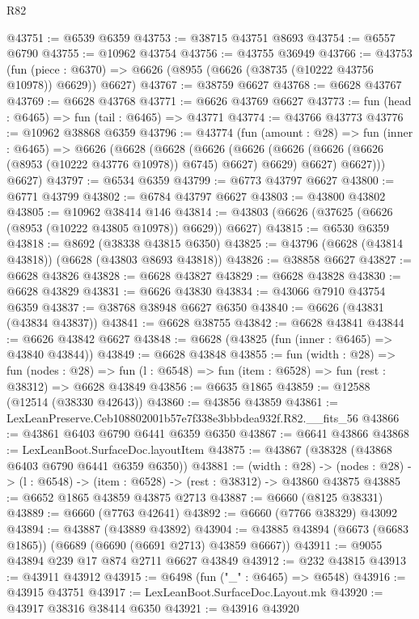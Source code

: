 \begin{lexlean}{R82}
\begin{coremodule}
@43751 := @6539 @6359
@43753 := @38715 @43751 @8693
@43754 := @6557 @6790
@43755 := @10962 @43754
@43756 := @43755 @36949
@43766 := @43753
    (fun (piece : @6370) => @6626 (@8955 (@6626 (@38735 (@10222 @43756 @10978)) @6629)) @6627)
@43767 := @38759 @6627
@43768 := @6628 @43767
@43769 := @6628 @43768
@43771 := @6626 @43769 @6627
@43773 := fun (head : @6465) => fun (tail : @6465) => @43771
@43774 := @43766 @43773
@43776 := @10962 @38868 @6359
@43796 := @43774
    (fun (amount : @28) =>
    fun (inner : @6465) =>
    @6626
      (@6628
        (@6628
          (@6626
            (@6626 (@6626 (@6626 (@6626 (@8953 (@10222 @43776 @10978)) @6745) @6627) @6629) @6627)
            @6627)))
      @6627)
@43797 := @6534 @6359
@43799 := @6773 @43797 @6627
@43800 := @6771 @43799
@43802 := @6784 @43797 @6627
@43803 := @43800 @43802
@43805 := @10962 @38414 @146
@43814 := @43803 (@6626 (@37625 (@6626 (@8953 (@10222 @43805 @10978)) @6629)) @6627)
@43815 := @6530 @6359
@43818 := @8692 (@38338 @43815 @6350)
@43825 := @43796 (@6628 (@43814 @43818)) (@6628 (@43803 @8693 @43818))
@43826 := @38858 @6627
@43827 := @6628 @43826
@43828 := @6628 @43827
@43829 := @6628 @43828
@43830 := @6628 @43829
@43831 := @6626 @43830
@43834 := @43066 @7910 @43754 @6359
@43837 := @38768 @38948 @6627 @6350
@43840 := @6626 (@43831 (@43834 @43837))
@43841 := @6628 @38755
@43842 := @6628 @43841
@43844 := @6626 @43842 @6627
@43848 := @6628 (@43825 (fun (inner : @6465) => @43840 @43844))
@43849 := @6628 @43848
@43855 := fun (width : @28) =>
  fun (nodes : @28) => fun (l : @6548) => fun (item : @6528) => fun (rest : @38312) => @6628 @43849
@43856 := @6635 @1865
@43859 := @12588 (@12514 (@38330 @42643))
@43860 := @43856 @43859
@43861 := LexLeanPreserve.Ceb108802001b57e7f338e3bbbdea932f.R82.__fits_56
@43866 := @43861 @6403 @6790 @6441 @6359 @6350
@43867 := @6641 @43866
@43868 := LexLeanBoot.SurfaceDoc.layoutItem
@43875 := @43867 (@38328 (@43868 @6403 @6790 @6441 @6359 @6350))
@43881 := (width : @28) ->
  (nodes : @28) -> (l : @6548) -> (item : @6528) -> (rest : @38312) -> @43860 @43875
@43885 := @6652 @1865 @43859 @43875 @2713
@43887 := @6660 (@8125 @38331)
@43889 := @6660 (@7763 @42641)
@43892 := @6660 (@7766 @38329) @43092
@43894 := @43887 (@43889 @43892)
@43904 := @43885 @43894 (@6673 (@6683 @1865)) (@6689 (@6690 (@6691 @2713) @43859 @6667))
@43911 := @9055 @43894 @239 @17 @874 @2711 @6627 @43849
@43912 := @232 @43815
@43913 := @43911 @43912
@43915 := @6498 (fun ("_" : @6465) => @6548)
@43916 := @43915 @43751
@43917 := LexLeanBoot.SurfaceDoc.Layout.mk
@43920 := @43917 @38316 @38414 @6350
@43921 := @43916 @43920

\end{coremodule}
\end{lexlean}
